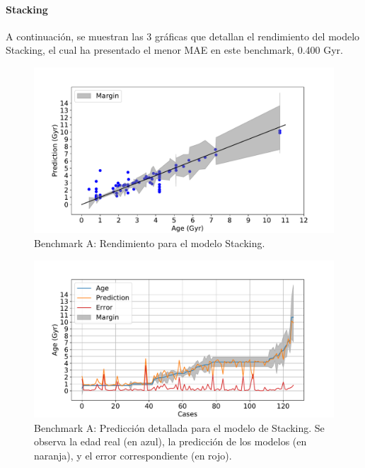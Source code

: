\paragraph{Stacking} 
A continuación, se muestran las 3 gráficas que detallan el rendimiento del modelo Stacking, el cual ha presentado el menor MAE en este benchmark, 0.400 Gyr.

\begin{figure}[H]
\begin{center}
 \includegraphics[width=0.8\linewidth]{Figuras/Experimentos/B_A_stacking_1.pdf}
\end{center}
\caption{Benchmark A: Rendimiento para el modelo Stacking.}
 \label{fig:benchA_details_stacking_1}
\end{figure}

\begin{figure}[H]
\begin{center}
 \includegraphics[width=0.8\linewidth]{Figuras/Experimentos/B_A_stacking_2.pdf}
\end{center}
\caption{Benchmark A: Predicción detallada para el modelo de Stacking. Se observa la edad real (en azul), la predicción de los modelos (en naranja), y el error correspondiente (en rojo).}
 \label{fig:benchA_details_stacking_2}
\end{figure}

